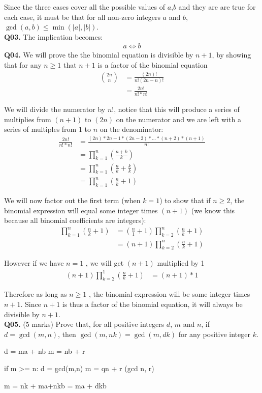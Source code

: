 \documentclass[11pt]{article}
\begin{document}
Since the three cases cover all the possible values of $a$,$b$ and they are are true for each case, it must be that for all non-zero integers $a$ and $b$, $\gcd(a, b) \leq \min(|a|, |b|)$.\\


\textbf{Q03.} The implication becomes:
\begin{align*}
a \iff b
\end{align*}
\textbf{Q04.} We will prove the the binomial equation is divisible by $n+1$, by showing that for any $n\geq1$ that $n+1$ is a factor of the binomial equation
\begin{align*}
\binom{2n}{n} & = \frac{(2n)!}{n!(2n-n)!}\\
&= \frac{2n!}{n!*n!}
\end{align*}

We will divide the numerator by $n!$, notice that this will produce a series of multiplies from $(n+1)$ to $(2n)$ on the numerator and we are left with a series of multiples from $1$ to $n$ on the denominator:
\begin{align*}
\frac{2n!}{n!*n!} &= \frac{(2n)*2n-1*(2n-2)*...*(n+2)*(n+1)}{n!}\\
&= \prod_{k=1}^{n}(\frac{n+k}{k})\\
&= \prod_{k=1}^{n}(\frac{n}{k}+\frac{k}{k})\\
&= \prod_{k=1}^{n}(\frac{n}{k}+1)
\end{align*}

We will now factor out the first term (when $k = 1$) to show that if $n\geq 2$, the binomial expression will equal some integer times $(n+1)$  (we know this because all binomial coefficients are integers):
\begin{align*}
\prod_{k=1}^{n}(\frac{n}{k}+1) & = (\frac{n}{1} + 1) \prod_{k=2}^{n}(\frac{n}{k}+1)\\
&=  (n + 1) \prod_{k=2}^{n}(\frac{n}{k}+1)
\end{align*}

However if we have $n = 1$ , we will get $(n+1)$ multiplied by 1
\begin{align*}
(n + 1) \prod_{k=2}^{1}(\frac{n}{k}+1) & = (n+1)* 1
\end{align*}

Therefore as long as $ n \geq 1 $ , the binomial expression will be some integer times $n+1$. Since $n+1$ is thus a factor of the binomial equation, it will always be divisible by $n+1$.\\

\textbf{Q05.} (5 marks) Prove that, for all positive integers $d$, $m$ and $n$, if $d = \gcd(m, n)$, then $\gcd(m, nk) = \gcd(m, dk)$ for any positive integer $k$.



d = ma + nb 
m = nb + r

if m >=  n:
d = gcd(m,n)
m = qn + r
(gcd n, r)



m = nk + 
ma+nkb = ma + dkb
\end{document}
